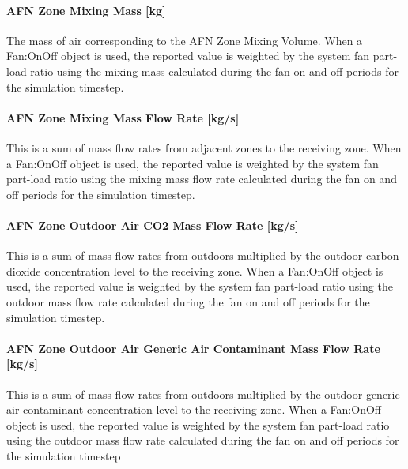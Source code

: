\paragraph{AFN Zone Mixing Mass {[}kg{]}}\label{afn-zone-mixing-mass-kg}

The mass of air corresponding to the AFN Zone Mixing Volume. When a Fan:OnOff object is used, the reported value is weighted by the system fan part-load ratio using the mixing mass calculated during the fan on and off periods for the simulation timestep.

\paragraph{AFN Zone Mixing Mass Flow Rate {[}kg/s{]}}\label{afn-zone-mixing-mass-flow-rate-kgs}

This is a sum of mass flow rates from adjacent zones to the receiving zone. When a Fan:OnOff object is used, the reported value is weighted by the system fan part-load ratio using the mixing mass flow rate calculated during the fan on and off periods for the simulation timestep.

\paragraph{AFN Zone Outdoor Air CO2 Mass Flow Rate {[}kg/s{]}}\label{afn-zone-outdoor-air-co2-mass-flow-rate-kgs}

This is a sum of mass flow rates from outdoors multiplied by the outdoor carbon dioxide concentration level to the receiving zone. When a Fan:OnOff object is used, the reported value is weighted by the system fan part-load ratio using the outdoor mass flow rate calculated during the fan on and off periods for the simulation timestep.

\paragraph{AFN Zone Outdoor Air Generic Air Contaminant Mass Flow Rate {[}kg/s{]}}\label{afn-zone-outdoor-air-generic-air-contaminant-mass-flow-rate-kgs}

This is a sum of mass flow rates from outdoors multiplied by the outdoor generic air contaminant concentration level to the receiving zone. When a Fan:OnOff object is used, the reported value is weighted by the system fan part-load ratio using the outdoor mass flow rate calculated during the fan on and off periods for the simulation timestep

